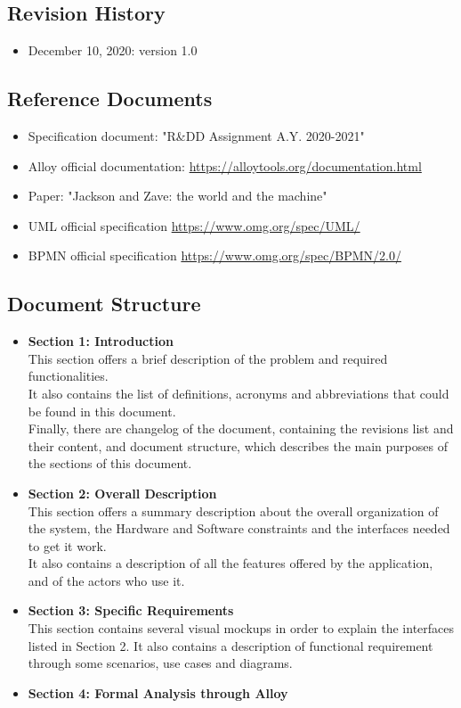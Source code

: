 \documentclass[table, 12pt]{article}
\begin{document}
\begin{flushleft}
    \subsection{Revision History}
    \begin{itemize}
        \item December 10, 2020: version 1.0
    \end{itemize}
    \subsection{Reference Documents}
    \begin{itemize}
        \item {Specification document: "R\&DD Assignment A.Y. 2020-2021"}
        \item {Alloy official documentation: \href{https://alloytools.org/documentation.html}{https://alloytools.org/documentation.html}}
        \item {Paper: "Jackson and Zave: the world and the machine"}
        \item {UML official specification \href{https://www.omg.org/spec/UML/}{https://www.omg.org/spec/UML/}}
        \item {BPMN official specification \href{https://www.omg.org/spec/BPMN/2.0/}{https://www.omg.org/spec/BPMN/2.0/}}
    \end{itemize}
    \subsection{Document Structure}
    \begin{itemize}
        \item {\textbf{Section 1: Introduction}\\This section offers a brief description of the problem and required functionalities. \\It also contains the list of definitions, acronyms and abbreviations that could be found in this document. \\Finally, there are changelog of the document, containing the revisions list and their content, and document structure, which describes the main purposes of the sections of this document.}
        \item {\textbf{Section 2: Overall Description}\\This section offers a summary description about the overall organization of the system, the Hardware and Software constraints and the interfaces needed to get it work.\\It also contains a description of all the features offered by the application, and of the actors who use it.}
        \item {\textbf{Section 3: Specific Requirements}\\This section contains several visual mockups in order to explain the interfaces listed in Section 2. It also contains a description of functional requirement through some scenarios, use cases and diagrams.}
        \item {\textbf{Section 4: Formal Analysis through Alloy}}
    \end{itemize}
    \newpage

\end{flushleft}
\end{document}
